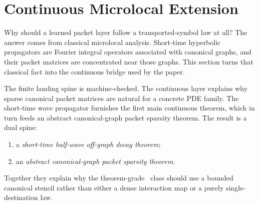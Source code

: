 \section{Continuous Microlocal Extension}
\label{sec:continuous}

Why should a learned packet layer follow a transported-symbol law at all? The answer comes from classical microlocal analysis. Short-time hyperbolic propagators are Fourier integral operators associated with canonical graphs, and their packet matrices are concentrated near those graphs. This section turns that classical fact into the continuous bridge used by the paper.

The finite landing spine is machine-checked. The continuous layer explains why sparse canonical packet matrices are natural for a concrete PDE family. The short-time wave propagator furnishes the first main continuous theorem, which in turn feeds an abstract canonical-graph packet sparsity theorem. The result is a dual spine:
\begin{enumerate}
\item a \emph{short-time half-wave off-graph decay theorem};
\item an \emph{abstract canonical-graph packet sparsity theorem}.
\end{enumerate}
Together they explain why the theorem-grade \MiNO\ class should use a bounded canonical stencil rather than either a dense interaction map or a purely single-destination law.

